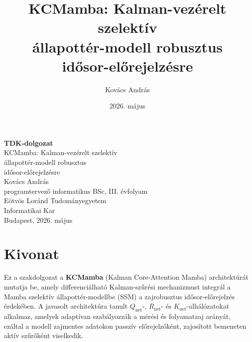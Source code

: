 \documentclass[
]{elteikthesis}[2024/04/26]
\title{KCMamba: Kalman-vezérelt szelektív\\
       állapottér-modell robusztus\\
       idősor-előrejelzésre}
\date{2026. május}
\author{Kovács András}
\affiliation{oktató}
\begin{document}



\begin{titlepage}
    \vspace*{\fill}
    \begin{center}
        {\Huge\bfseries TDK-dolgozat}\\[2.5cm]
        {\LARGE KCMamba: Kalman-vezérelt szelektív\\[0.4em]
                állapottér-modell robusztus\\[0.4em]
                idősor-előrejelzésre}\\[3cm]
        {\Large Kovács András}\\[0.5cm]
        {\large programtervező informatikus BSc, III. évfolyam}\\[2cm]
        {\large Eötvös Loránd Tudományegyetem\\[0.3em]
                Informatikai Kar}\\[0.8cm]
        {\large Budapest, 2026. május}
    \end{center}
    \vspace*{\fill}
\end{titlepage}

\maketitle

\chapter*{Kivonat}

Ez a szakdolgozat a \textbf{KCMamba} (Kalman Core-Attention Mamba)
architektúrát mutatja be, amely differenciálható Kalman-szűrési mechanizmust
integrál a Mamba szelektív állapottér-modellbe (SSM) a zajrobusztus
idősor-előrejelzés érdekében. A javasolt architektúra tanult $Q_\text{net}$-,
$R_\text{net}$- és $K_\text{net}$-alhálózatokat alkalmaz, amelyek adaptívan
szabályozzák a mérési és folyamatzaj arányát, ezáltal a modell zajmentes
adatokon passzív előrejelzőként, zajosított bemeneten aktív szűrőként viselkedik.
\end{document}
